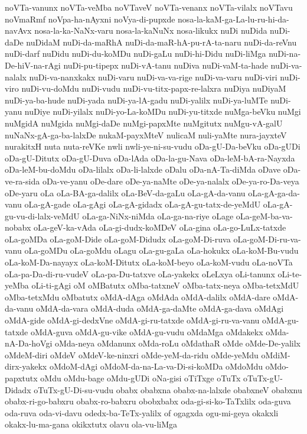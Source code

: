{noVTa-vanunx
noVTa-veMba
noVTaveV
noVTa-venanx
noVTa-vilalx
noVTavu
noVmaRmf
noVpa-ha-nAyxni
noVya-di-pupxde
nosa-la-kaM-ga-La-lu-ru-hi-da-navAvx
nosa-la-ka-NaNx-varu
nosa-la-kaNuNx
nosa-likukx
nuDi
nuDida
nuDi-daDe
nuDidaM
nuDi-da-maRhA
nuDi-da-maR-hA-pu-rA-ta-naru
nuDi-da-reVnu
nuDi-darf
nuDidu
nuDi-du-koMDu
nuDi-gaLu
nuDi-hi-Didu
nuDi-liMga
nuDi-na-De-hiV-na-rAgi
nuDi-pu-tipepx
nuDi-vA-tanu
nuDiva
nuDi-vaM-ta-hade
nuDi-va-nalalx
nuDi-va-nanxkakx
nuDi-varu
nuDi-va-va-rige
nuDi-va-varu
nuDi-viri
nuDi-viro
nuDi-vu-doMdu
nuDi-vudu
nuDi-vu-titx-papx-re-lalxra
nuDiya
nuDiyaM
nuDi-ya-ba-hude
nuDi-yada
nuDi-ya-lA-gadu
nuDi-yalilx
nuDi-ya-luMTe
nuDi-yanu
nuDiye
nuDi-yilalx
nuDi-yo-La-koMDu
nuDi-yu-titxde
nuMga-beVku
nuMgi
nuMgidA
nuMgida
nuMgi-daDe
nuMgi-papxMte
nuMgitutx
nuMgu-vA-galU
nuNaNx-gA-ga-ba-lalxDe
nukaM-payxMteV
nulicaM
nuli-yaMte
nura-jayxteV
nurakitxH
nuta
nuta-reVKe
nwli
nwli-ye-ni-su-vudu
oDa-gU-Da-beVku
oDa-gUDi
oDa-gU-Ditutx
oDa-gU-Duva
oDa-lAda
oDa-la-gu-Nava
oDa-leM-bA-ra-Nayxda
oDa-leM-bu-doMdu
oDa-lilalx
oDa-li-lalxde
oDalu
oDa-nA-Ta-diMda
oDave
oDa-ve-ra-sida
oDa-ve-yanu
oDe-dare
oDe-ya-naMte
oDe-ya-nalalx
oDe-ya-ro-Da-veya
oDe-yaru
oLa
oLa-BA-ga-dalilx
oLa-BeV-da-gaLu
oLa-gA-da-vanu
oLa-gA-ga-da-vanu
oLa-gA-gade
oLa-gAgi
oLa-gA-gidadx
oLa-gA-gu-tatx-de-yeMdU
oLa-gA-gu-vu-di-lalx-veMdU
oLa-ga-NiNx-niMda
oLa-ga-na-riye
oLage
oLa-geM-ba-va-nobabx
oLa-geV-ka-vAda
oLa-gi-dudx-koMDeV
oLa-gina
oLa-go-LuLx-tatxde
oLa-goMDa
oLa-goM-Dide
oLa-goM-Didudx
oLa-goM-Di-ruva
oLa-goM-Di-ru-va-vanu
oLa-goMDu
oLa-goMdu
oLagu
oLa-gu-gaLa
oLa-hokukx
oLa-koM-Bu-vudu
oLa-koM-Da-nayayx
oLa-koM-Ditutx
oLa-koM-beyo
oLa-koM-vudu
oLa-noVTa
oLa-pa-Da-di-ru-vudeV
oLa-pa-Du-tatxve
oLa-yakekx
oLeLxya
oLi-tanunx
oLi-te-yeMba
oLi-ti-gAgi
oM
oMBatutx
oMba-tatxneV
oMba-tatx-neya
oMba-tetxMdU
oMba-tetxMdu
oMbatutx
oMdA-dAga
oMdAda
oMdA-dalilx
oMdA-dare
oMdA-da-vanu
oMdA-da-vara
oMdA-duda
oMdA-ga-daMte
oMdA-ga-dava
oMdAgi
oMdA-gide
oMdA-gi-dedxVne
oMdA-gi-ru-tatxde
oMdA-gi-ru-va-vanu
oMdA-gu-tatxde
oMdA-guva
oMdA-gu-vike
oMdA-gu-vudu
oMdaMga
oMdakekx
oMda-nA-Da-hoVgi
oMda-neya
oMdanunx
oMda-roLu
oMdathaR
oMde
oMde-De-yalilx
oMdeM-diri
oMdeV
oMdeV-ke-ninxri
oMde-yeM-da-ridu
oMde-yeMdu
oMdiM-dirx-yakekx
oMdoM-dAgi
oMdoM-da-na-La-va-Di-si-koMDa
oMdoMdu
oMdo-papxtutx
oMdu
oMdu-bage
oMdu-gUDi
oNa-gisi
oTiTxge
oTuTx
oTuTx-gU-Didadx
oTuTx-gU-Di-su-vudu
obabx
obabxna
obabx-na-lalxde
obabxneV
obabxnu
obabx-ri-go-babxru
obabx-ro-babxru
obobxbabx
oda-gi-si-ko-TaTxlilx
oda-guva
oda-ruva
oda-vi-davu
odedx-ba-TeTx-yalilx
of
ogagxda
ogu-mi-geya
okakxli
okakx-lu-ma-gana
okikxtutx
olavu
ola-vu-liMga
}
